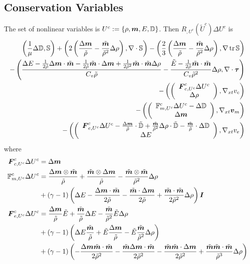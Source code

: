 \documentclass{article}
\begin{document}
\subsection*{Conservation Variables}
The set of nonlinear variables is $U^c:=\left\{ \rho,\boldsymbol m,E,\mathbb{D} \right\}$.
Then $R_{,U^c}(\tilde U^c)\Delta U^c$ is
\begin{align*}
	\left( \frac{1}{\mu}\Delta\mathbb{D},\mathbb{S} \right)+\left( 2\left( \frac{\Delta\boldsymbol m}{\tilde\rho}-\frac{\tilde{\boldsymbol m}}{\tilde\rho^2}\Delta\rho \right),\nabla\cdot\mathbb{S} \right)
	-\left( \frac{2}{3}\left( \frac{\Delta\boldsymbol m}{\tilde\rho}-\frac{\tilde{\boldsymbol m}}{\tilde\rho^2}\Delta\rho \right),\nabla\operatorname*{tr}{\mathbb{S}} \right)\\
	-\left( \frac{\Delta E-\frac{1}{2\tilde\rho}\Delta\boldsymbol m\cdot\tilde{\boldsymbol m}-\frac{1}{2\tilde\rho}\tilde{\boldsymbol m}\cdot\Delta\boldsymbol m
	+\frac{1}{2\tilde\rho^2}\tilde{\boldsymbol m}\cdot\tilde{\boldsymbol m}\Delta\rho}{C_v\tilde\rho}
	-\frac{\tilde E-\frac{1}{2\tilde\rho}\tilde{\boldsymbol m}\cdot\tilde{\boldsymbol m}}{C_v\tilde\rho^2}\Delta\rho,\nabla\cdot\boldsymbol\tau \right)\\
	-\left( \left( \begin{array}{c} \boldsymbol F^c_{c,U^c}\Delta U^c\\ \Delta\rho\\ \end{array} \right),\nabla_{xt} v_c \right)\\
	-\left( \left( \begin{array}{c} \mathbb{F}^c_{m,U^c}\Delta U^c-\Delta\mathbb{D}\\ \Delta\boldsymbol m\\ \end{array} \right),\nabla_{xt}\boldsymbol v_m \right)\\
	-\left( \left( \begin{array}{c} \boldsymbol F^c_{e,U^c}\Delta U^c-\frac{\Delta\boldsymbol m}{\tilde\rho}\cdot\tilde{\mathbb{D}}
	+\frac{\tilde{\boldsymbol m}}{\tilde\rho^2}\Delta\rho\cdot\tilde{\mathbb{D}}-\frac{\tilde{\boldsymbol m}}{\tilde\rho}\cdot\Delta\mathbb{D}\\ \Delta E\\ \end{array} \right),\nabla_{xt} v_e \right)
\end{align*}
where
\begin{align*}
\boldsymbol F^c_{c,U^c}\Delta U^c&=\Delta\boldsymbol m\\
\mathbb{F}^c_{m,U^c}\Delta U^c&=
\frac{\Delta\boldsymbol m\otimes\tilde{\boldsymbol m}}{\tilde\rho}
+\frac{\tilde{\boldsymbol m}\otimes\Delta\boldsymbol m}{\tilde\rho}
-\frac{\tilde{\boldsymbol m}\otimes\tilde{\boldsymbol m}}{\tilde\rho^2}\Delta\rho\\
&+(\gamma-1)\left( \Delta E
-\frac{\Delta\boldsymbol m\cdot\tilde{\boldsymbol m}}{2\tilde\rho}
-\frac{\tilde{\boldsymbol m}\cdot\Delta\boldsymbol m}{2\tilde\rho}
+\frac{\tilde{\boldsymbol m}\cdot\tilde{\boldsymbol m}}{2\tilde\rho^2}\Delta\rho
 \right)\boldsymbol I\\
\boldsymbol F^c_{e,U^c}\Delta U^c&=
\frac{\Delta\boldsymbol m}{\tilde\rho}\tilde E
+\frac{\tilde{\boldsymbol m}}{\tilde\rho}\Delta E
-\frac{\tilde{\boldsymbol m}}{\tilde\rho^2}\tilde E\Delta\rho\\
&+(\gamma-1)\left( 
\Delta E\frac{\tilde{\boldsymbol m}}{\tilde\rho}
+\tilde E\frac{\Delta\boldsymbol m}{\tilde\rho}
-\tilde E\frac{\tilde{\boldsymbol m}}{\tilde\rho^2}\Delta\rho \right)\\
&+(\gamma-1)\left( 
-\frac{\Delta\boldsymbol m\tilde{\boldsymbol m}\cdot\tilde{\boldsymbol m}}{2\tilde\rho^2}
-\frac{\tilde{\boldsymbol m}\Delta\boldsymbol m\cdot\tilde{\boldsymbol m}}{2\tilde\rho^2}
-\frac{\tilde{\boldsymbol m}\tilde{\boldsymbol m}\cdot\Delta\boldsymbol m}{2\tilde\rho^2}
+\frac{\tilde{\boldsymbol m}\tilde{\boldsymbol m}\cdot\tilde{\boldsymbol m}}{\tilde\rho^3}\Delta\rho
 \right)\\
\end{align*}
\end{document}
